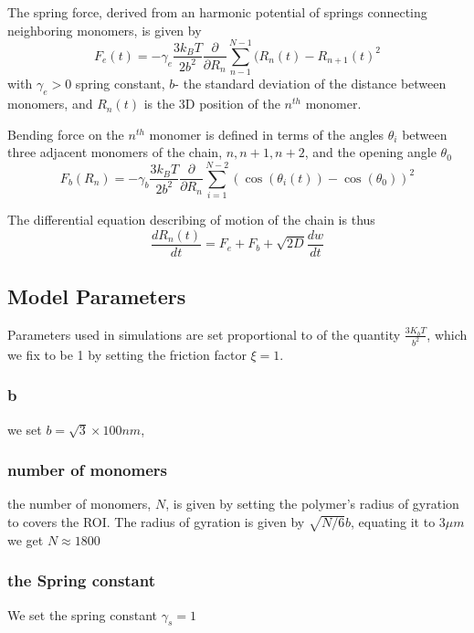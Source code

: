 \documentclass[12pt]{report}
\begin{document}
     The spring force, derived from an harmonic potential of springs connecting neighboring monomers, is given by
     \begin{equation*}
      F_e(t) = -\gamma_e\frac{3k_BT}{2b^2}\frac{\partial}{\partial R_n}\sum_{n-1}^{N-1}(R_n(t)-R_{n+1}(t)^2
     \end{equation*}
     with $\gamma_e>0$ spring constant, $b$- the standard deviation of the distance between monomers, and $R_n(t)$ is the 3D position of the $n^{th}$ monomer.
     
     Bending force on the $n^{th}$ monomer is defined in terms of the angles $\theta_i$ between three adjacent monomers of the chain, $n,n+1,n+2$, and the opening angle $\theta_0$
     \begin{equation*}
     F_b(R_n) = -\gamma_b\frac{3k_BT}{2b^2}\frac{\partial}{\partial R_n}\sum_{i=1}^{N-2}(\cos(\theta_i(t))-\cos(\theta_0))^2
     \end{equation*}
               
     The differential equation describing of motion of the chain is thus 
     \begin{equation*}
     \frac{dR_n(t)}{dt}= F_e +F_b +\sqrt{2D} \frac{dw}{dt}     
     \end{equation*}
     
    \subsection{Model Parameters}
      Parameters used in simulations are set proportional to of the quantity $\frac{3K_bT}{b^2}$, which we fix to be 1 by setting the friction factor $\xi=1$. 
    \subsubsection{b} 
      we set $b=\sqrt{3} \times 100 nm$, 
    \subsubsection{number of monomers}
      the number of monomers, $N$, is given by setting the polymer's radius of gyration to covers the ROI. The radius of gyration is given by $\sqrt{N/6}b$, equating it to $3\mu m$ we get $N\approx 1800$ 
                     
     \subsubsection{the Spring constant}
       We set the spring constant $\gamma_s =1$
\end{document}
